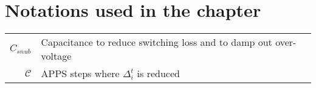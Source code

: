 \newpage
\section{Notations used in the chapter}
		
  \begin{scriptsize}
\begin{tabularx}{\textwidth}{r|X}



  

$C_{snub}$ 												& Capacitance to reduce switching loss and to damp out over-voltage\\
$\mathcal{C}$                           & APPS steps where $\Delta^t_i$ is reduced\\

\end{tabularx}
\end{scriptsize}
